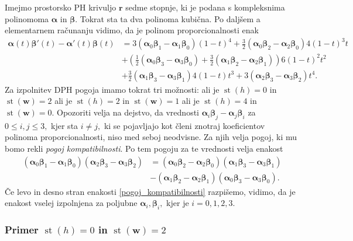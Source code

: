 \documentclass[12pt,a4paper,twoside]{article}
\theoremstyle{definition} %
\theoremstyle{plain} %
\theoremstyle{primerstyle}
\numberwithin{equation}{section}  %
\newcommand{\rV}{\mathbf{r}}
\newcommand{\wV}{\mathbf{w}}
\newcommand{\balpha}{\boldsymbol \alpha}
\newcommand{\bbeta}{\boldsymbol \beta}
\DeclareMathOperator{\st}{st}
\begin{document}
Imejmo prostorsko PH krivuljo $\rV$ sedme stopnje, ki je podana s kompleksnima polinomoma $\balpha$ in $\bbeta.$ Tokrat sta ta dva polinoma kubična. Po daljšem a elementarnem računanju vidimo, da je polinom proporcionalnosti enak
\begin{align}
	\balpha(t)\bbeta'(t)-\balpha'(t)\bbeta(t)&=3(\balpha_0\bbeta_1-\balpha_1\bbeta_0)(1-t)^4+\frac{3}{2}(\balpha_0\bbeta_2-\balpha_2\bbeta_0)4(1-t)^3t\nonumber\\
	&+\left(\frac{1}{2}(\balpha_0\bbeta_3-\balpha_3\bbeta_0)+\frac{3}{2}(\balpha_1\bbeta_2-\balpha_2\bbeta_1)\right)6(1-t)^2t^2\label{propoly_bern_7}\\
	&+\frac{3}{2}(\balpha_1\bbeta_3-\balpha_3\bbeta_1)4(1-t)t^3+3(\balpha_2\bbeta_3-\balpha_3\bbeta_2)t^4.\nonumber
\end{align}
Za izpolnitev DPH pogoja imamo tokrat tri možnosti: ali je $\st(h)=0$ in $\st(\wV)=2$ ali je $\st(h)=2$ in $\st(\wV)=1$ ali je $\st(h)=4$ in $\st(\wV)=0.$ Opozoriti velja na dejstvo, da vrednosti $\balpha_i\bbeta_j-\balpha_j\bbeta_i$ za $0\leq i,j\leq 3,$ kjer sta $i\neq j,$ ki se pojavljajo kot členi znotraj koeficientov polinoma proporcionalnosti, niso med seboj neodvisne. Za njih velja pogoj, ki mu bomo rekli \emph{pogoj kompatibilnosti}. Po tem pogoju za te vrednosti velja enakost
\begin{align}
	(\balpha_0\bbeta_1-\balpha_1\bbeta_0)(\balpha_2\bbeta_3-\balpha_3\bbeta_2)&=(\balpha_0\bbeta_2-\balpha_2\bbeta_0)(\balpha_1\bbeta_3-\balpha_3\bbeta_1)\nonumber\\
	&-(\balpha_1\bbeta_2-\balpha_2\bbeta_1)(\balpha_0\bbeta_3-\balpha_3\bbeta_0).\label{pogoj_kompatibilnosti}
\end{align}
Če levo in desno stran enakosti \eqref{pogoj_kompatibilnosti} razpišemo, vidimo, da je enakost vselej izpolnjena za poljubne $\balpha_i,\bbeta_i,$ kjer je $i=0,1,2,3.$

\subsubsection{Primer \texorpdfstring{$\st(h)=0$}{st(h)=0} in \texorpdfstring{$\st(\wV)=2$}{st(w)=2}}
\label{klasifikacija_h0w2}
\end{document}
